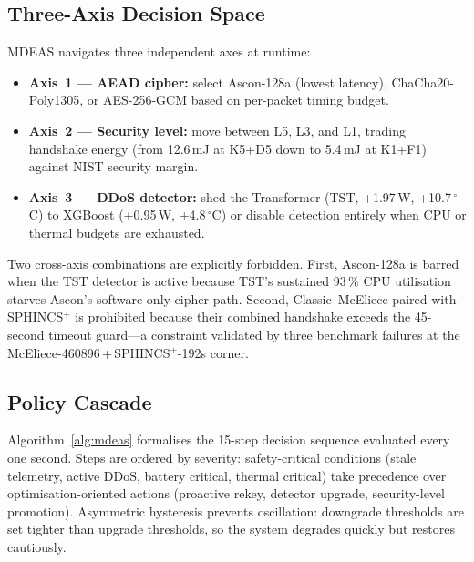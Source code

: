 \documentclass[conference]{IEEEtran}
\newcommand{\mdeas}{\textsc{MDEAS}}
\begin{document}
\subsection{Three-Axis Decision Space}
\label{sec:axes}

\mdeas{} navigates three independent axes at runtime:

\begin{itemize}
  \item \textbf{Axis~1 --- AEAD cipher:} select Ascon-128a (lowest
    latency), ChaCha20-Poly1305, or AES-256-GCM based on per-packet
    timing budget.

  \item \textbf{Axis~2 --- Security level:} move between L5, L3, and
    L1, trading handshake energy (from 12.6\,mJ at K5+D5 down to
    5.4\,mJ at K1+F1) against NIST security margin.

  \item \textbf{Axis~3 --- DDoS detector:} shed the Transformer
    (TST, +1.97\,W, +10.7\,$^\circ$C) to XGBoost (+0.95\,W,
    +4.8\,$^\circ$C) or disable detection entirely when CPU or
    thermal budgets are exhausted.
\end{itemize}

Two cross-axis combinations are explicitly forbidden.
First, Ascon-128a is barred when the TST detector is active
because TST's sustained 93\,\% CPU utilisation starves Ascon's
software-only cipher path.
Second, Classic~McEliece paired with SPHINCS$^+$ is prohibited
because their combined handshake exceeds the 45-second timeout
guard---a constraint validated by three benchmark failures at the
McEliece-460896\,+\,SPHINCS$^+$-192s corner.

\subsection{Policy Cascade}
\label{sec:cascade}

Algorithm~\ref{alg:mdeas} formalises the 15-step decision sequence
evaluated every one second.  Steps are ordered by severity:
safety-critical conditions (stale telemetry, active DDoS, battery
critical, thermal critical) take precedence over optimisation-oriented
actions (proactive rekey, detector upgrade, security-level promotion).
Asymmetric hysteresis prevents oscillation: downgrade thresholds are
set tighter than upgrade thresholds, so the system degrades quickly
but restores cautiously.
\end{document}
